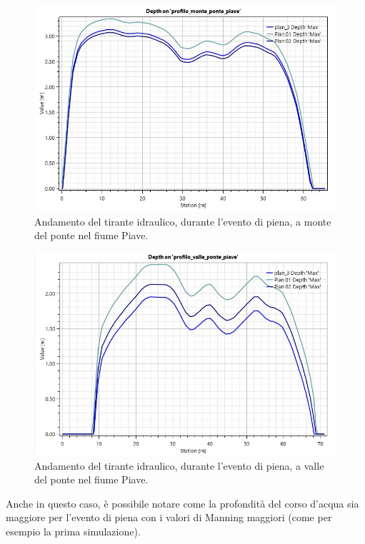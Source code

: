 \begin{figure}[htb] \centering
    \includegraphics[scale=0.5]{immagini/depth_monte_ponte_piave.JPG}
    \caption{Andamento del tirante idraulico, durante l'evento di piena, a monte del ponte nel fiume Piave.}
    \label{figure:depth_monte_ponte_piave}
\end{figure}

\begin{figure}[htb] \centering
    \includegraphics[scale=0.5]{immagini/depth_valle_ponte_piave.JPG}
    \caption{Andamento del tirante idraulico, durante l'evento di piena, a valle del ponte nel fiume Piave.}
    \label{figure:depth_valle_ponte_piave}
\end{figure}

Anche in questo caso, è possibile notare come la profondità del corso d'acqua sia maggiore per l'evento di piena con i valori di Manning maggiori (come per esempio la prima simulazione).

